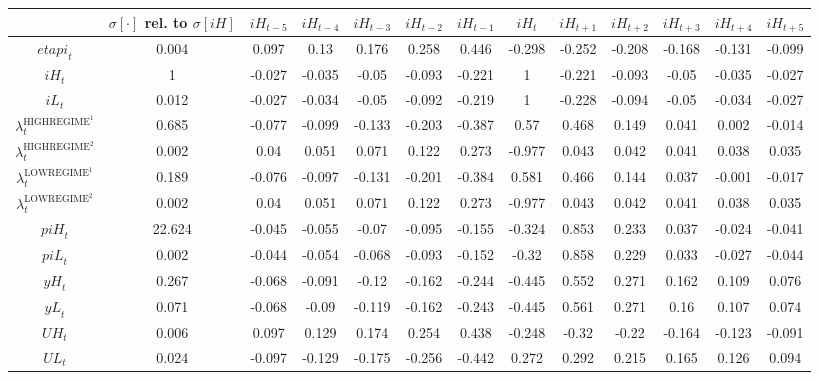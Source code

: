 \begin{tabular}{c|c|c|c|c|c|c|c|c|c|c|c|c|}
  & $\sigma[\cdot]$ rel. to $\sigma[{i\!H}]$ & ${i\!H}_{t-5}$ & ${i\!H}_{t-4}$ & ${i\!H}_{t-3}$ & ${i\!H}_{t-2}$ & ${i\!H}_{t-1}$ & ${i\!H}_{t}$ & ${i\!H}_{t+1}$ & ${i\!H}_{t+2}$ & ${i\!H}_{t+3}$ & ${i\!H}_{t+4}$ & ${i\!H}_{t+5}$\\
\hline
${e\!t\!a\!p\!i}_{t}$ & 0.004 & 0.097 & 0.13 & 0.176 & 0.258 & 0.446 & -0.298 & -0.252 & -0.208 & -0.168 & -0.131 & -0.099 \\
${i\!H}_{t}$ & 1 & -0.027 & -0.035 & -0.05 & -0.093 & -0.221 & 1 & -0.221 & -0.093 & -0.05 & -0.035 & -0.027 \\
${i\!L}_{t}$ & 0.012 & -0.027 & -0.034 & -0.05 & -0.092 & -0.219 & 1 & -0.228 & -0.094 & -0.05 & -0.034 & -0.027 \\
$\lambda^{\mathrm{HIGHREGIME}^{\mathrm{1}}}_{t}$ & 0.685 & -0.077 & -0.099 & -0.133 & -0.203 & -0.387 & 0.57 & 0.468 & 0.149 & 0.041 & 0.002 & -0.014 \\
$\lambda^{\mathrm{HIGHREGIME}^{\mathrm{2}}}_{t}$ & 0.002 & 0.04 & 0.051 & 0.071 & 0.122 & 0.273 & -0.977 & 0.043 & 0.042 & 0.041 & 0.038 & 0.035 \\
$\lambda^{\mathrm{LOWREGIME}^{\mathrm{1}}}_{t}$ & 0.189 & -0.076 & -0.097 & -0.131 & -0.201 & -0.384 & 0.581 & 0.466 & 0.144 & 0.037 & -0.001 & -0.017 \\
$\lambda^{\mathrm{LOWREGIME}^{\mathrm{2}}}_{t}$ & 0.002 & 0.04 & 0.051 & 0.071 & 0.122 & 0.273 & -0.977 & 0.043 & 0.042 & 0.041 & 0.038 & 0.035 \\
${p\!i\!H}_{t}$ & 22.624 & -0.045 & -0.055 & -0.07 & -0.095 & -0.155 & -0.324 & 0.853 & 0.233 & 0.037 & -0.024 & -0.041 \\
${p\!i\!L}_{t}$ & 0.002 & -0.044 & -0.054 & -0.068 & -0.093 & -0.152 & -0.32 & 0.858 & 0.229 & 0.033 & -0.027 & -0.044 \\
${y\!H}_{t}$ & 0.267 & -0.068 & -0.091 & -0.12 & -0.162 & -0.244 & -0.445 & 0.552 & 0.271 & 0.162 & 0.109 & 0.076 \\
${y\!L}_{t}$ & 0.071 & -0.068 & -0.09 & -0.119 & -0.162 & -0.243 & -0.445 & 0.561 & 0.271 & 0.16 & 0.107 & 0.074 \\
${U\!H}_{t}$ & 0.006 & 0.097 & 0.129 & 0.174 & 0.254 & 0.438 & -0.248 & -0.32 & -0.22 & -0.164 & -0.123 & -0.091 \\
${U\!L}_{t}$ & 0.024 & -0.097 & -0.129 & -0.175 & -0.256 & -0.442 & 0.272 & 0.292 & 0.215 & 0.165 & 0.126 & 0.094 \\
\hline
\end{tabular}


